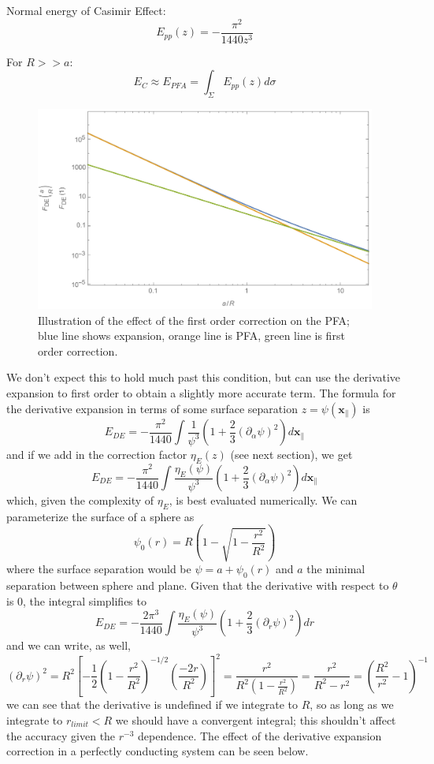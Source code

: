 \documentclass[11pt]{article}
\begin{document}
Normal energy of Casimir Effect:
$$
E_{pp}(z)=-\frac{\pi^2}{1440z^3}
$$

For $R>>a$:
$$
E_{C}\approx E_{PFA}=\int_{\Sigma}E_{pp}(z)d\sigma
$$
\begin{figure}[h]
\centering
\includegraphics[width=5in]{PFAExpansion}
\caption{Illustration of the effect of the first order correction on the PFA; blue line shows expansion, orange line is PFA, green line is first order correction.}\label{fig:expansion}
\end{figure}

We don't expect this to hold much past this condition, but can use the derivative expansion to first order to obtain a slightly more accurate term. The formula for the derivative expansion in terms of some surface separation $z=\psi(\mathbf{x}_\parallel)$ is
$$
E_{DE}=-\frac{\pi^2}{1440}\int\frac{1}{\psi^3}\left(1+\frac{2}{3}(\partial_\alpha \psi)^2\right)d\mathbf{x}_\parallel
$$
and if we add in the correction factor $\eta_E(z)$ (see next section), we get
$$
E_{DE}=-\frac{\pi^2}{1440}\int\frac{\eta_E(\psi)}{\psi^3}\left(1+\frac{2}{3}(\partial_\alpha \psi)^2\right)d\mathbf{x}_\parallel
$$
which, given the complexity of $\eta_E$, is best evaluated numerically. We can parameterize the surface of a sphere as
$$
\psi_0(r)=R\left(1-\sqrt{1-\frac{r^2}{R^2}}\right)
$$
where the surface separation would be $\psi=a+\psi_0(r)$ and $a$ the minimal separation between sphere and plane. Given that the derivative with respect to $\theta$ is 0, the integral simplifies to
$$
E_{DE}=-\frac{2\pi^3}{1440}\int\frac{\eta_E(\psi)}{\psi^3}\left(1+\frac{2}{3}(\partial_r \psi)^2\right)dr
$$
and we can write, as well, 
$$
(\partial_r\psi)^2=R^2\left[-\frac{1}{2}\left(1-\frac{r^2}{R^2}\right)^{-1/2}\left(\frac{-2r}{R^2}\right)\right]^2=\frac{r^2}{R^2(1-\frac{r^2}{R^2})}=\frac{r^2}{R^2-r^2}=\left(\frac{R^2}{r^2}-1\right)^{-1}
$$
we can see that the derivative is undefined if we integrate to $R$, so as long as we integrate to $r_{limit}<R$ we should have a convergent integral; this shouldn't affect the accuracy given the $r^{-3}$ dependence. The effect of the derivative expansion correction in a perfectly conducting system can be seen below.
\end{document}
